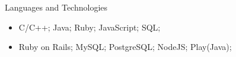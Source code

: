 \documentclass[]{mcdowellcv}
\begin{document}
	\begin{cvsection}{Languages and Technologies}
		\begin{cvsubsection}{}{}{}
			\begin{itemize}
				\item C/C++; Java; Ruby; JavaScript; SQL; 
				\item Ruby on Rails; MySQL; PostgreSQL; NodeJS; Play(Java);
			\end{itemize}
		\end{cvsubsection}
	\end{cvsection}
\end{document}
